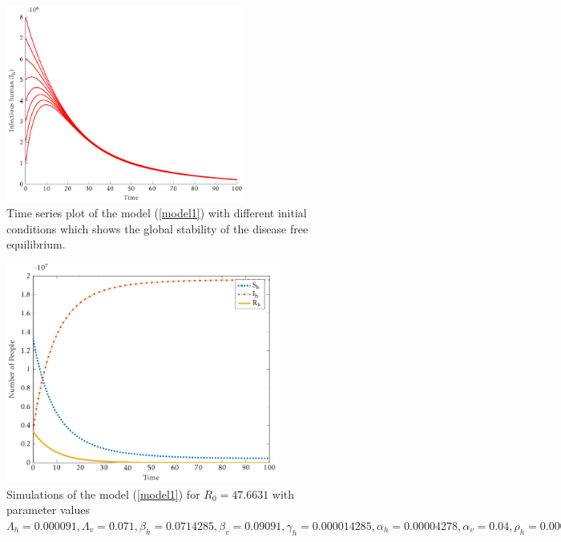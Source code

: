 \documentclass[review]{elsarticle}
\begin{document}
\begin{figure}[htb!]
\centering
\includegraphics[width=0.7\textwidth]{timeseries}
\caption{Time series plot of the model (\ref{model1}) with different initial conditions which shows the global stability of the disease free equilibrium.} \label{humanseriesplot}
\end{figure}

\begin{figure}[htb!]
\centering
\includegraphics[width=0.8\textwidth]{endemicsatble}
\caption[Simulations of the model (\ref{model1}) for $R_0=47.6631$]{Simulations of the model (\ref{model1}) for $R_0=47.6631$ with parameter values $\Lambda_h=0.000091,\Lambda_v=0.071,\beta_h=0.0714285,\beta_v=0.09091,\gamma_h=0.000014285,\alpha_h=0.00004278,\alpha_v=0.04,
\rho_h=0.0000027,\omega_h=0.109$} \label{endemicsatbleplot}
\end{figure}
\end{document}
